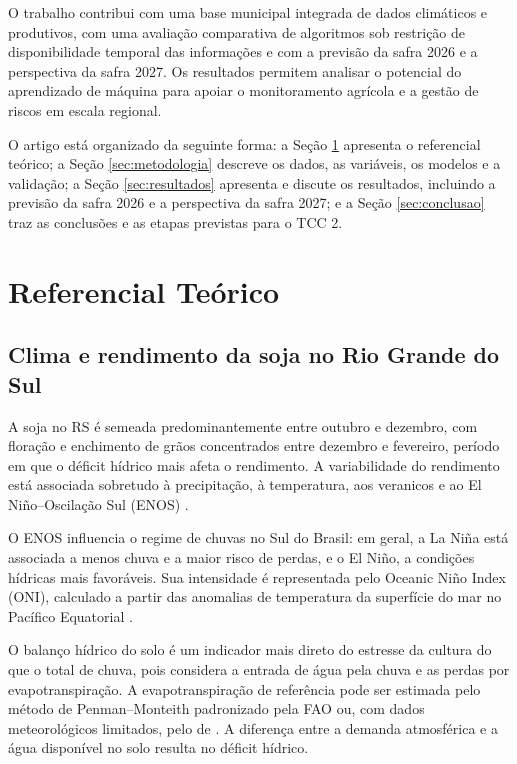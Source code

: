 \documentclass[
	article,			%
	11pt,				%
	oneside,			%
	a4paper,			%
	english,			%
	brazil,				%
	sumario=tradicional
	]{abntex2}
\begin{document}
O trabalho contribui com uma base municipal integrada de dados climáticos e produtivos, com uma avaliação comparativa de algoritmos sob restrição de disponibilidade temporal das informações e com a previsão da safra 2026 e a perspectiva da safra 2027. Os resultados permitem analisar o potencial do aprendizado de máquina para apoiar o monitoramento agrícola e a gestão de riscos em escala regional.

O artigo está organizado da seguinte forma: a Seção \ref{sec:referencial} apresenta o referencial teórico; a Seção \ref{sec:metodologia} descreve os dados, as variáveis, os modelos e a validação; a Seção \ref{sec:resultados} apresenta e discute os resultados, incluindo a previsão da safra 2026 e a perspectiva da safra 2027; e a Seção \ref{sec:conclusao} traz as conclusões e as etapas previstas para o TCC 2.

\section{Referencial Teórico}\label{sec:referencial}

\subsection{Clima e rendimento da soja no Rio Grande do Sul}

A soja no RS é semeada predominantemente entre outubro e dezembro, com floração e enchimento de grãos concentrados entre dezembro e fevereiro, período em que o déficit hídrico mais afeta o rendimento. A variabilidade do rendimento está associada sobretudo à precipitação, à temperatura, aos veranicos e ao El Niño--Oscilação Sul (ENOS) \cite{pilau2022,noia2020}.

O ENOS influencia o regime de chuvas no Sul do Brasil: em geral, a La Niña está associada a menos chuva e a maior risco de perdas, e o El Niño, a condições hídricas mais favoráveis. Sua intensidade é representada pelo Oceanic Niño Index (ONI), calculado a partir das anomalias de temperatura da superfície do mar no Pacífico Equatorial \cite{noaa}.

O balanço hídrico do solo é um indicador mais direto do estresse da cultura do que o total de chuva, pois considera a entrada de água pela chuva e as perdas por evapotranspiração. A evapotranspiração de referência pode ser estimada pelo método de Penman--Monteith padronizado pela FAO \cite{allen1998} ou, com dados meteorológicos limitados, pelo de . A diferença entre a demanda atmosférica e a água disponível no solo resulta no déficit hídrico.
\end{document}
